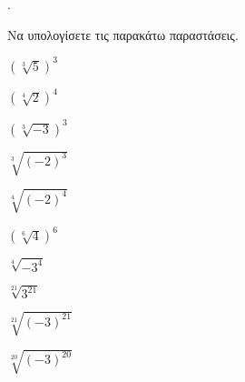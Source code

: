 \documentclass[11pt,a4paper,twocolumn]{article}
\newcounter{askhsh}
\newcommand{\askhsh}{\large\theaskhsh.\ \addtocounter{askhsh}{1}}
\begin{document}
\askhsh Να υπολογίσετε τις παρακάτω παραστάσεις.
\begin{multicols}{3}
\begin{alist}
\item $\left(\sqrt[3]{5}\right)^3$
\item $\left(\sqrt[4]{2}\right)^4$
\item $\left(\sqrt[3]{-3}\right)^3$
\item $\sqrt[3]{(-2)^3}$
\item $\sqrt[4]{(-2)^4}$
\item $\left(\sqrt[6]{4}\right)^6$
\item $\sqrt[4]{-3^4}$
\item $\sqrt[21]{3^{21}}$
\item $\sqrt[21]{(-3)^{21}}$
\item $\sqrt[20]{(-3)^{20}}$
\end{alist}
\end{multicols}
\end{document}
